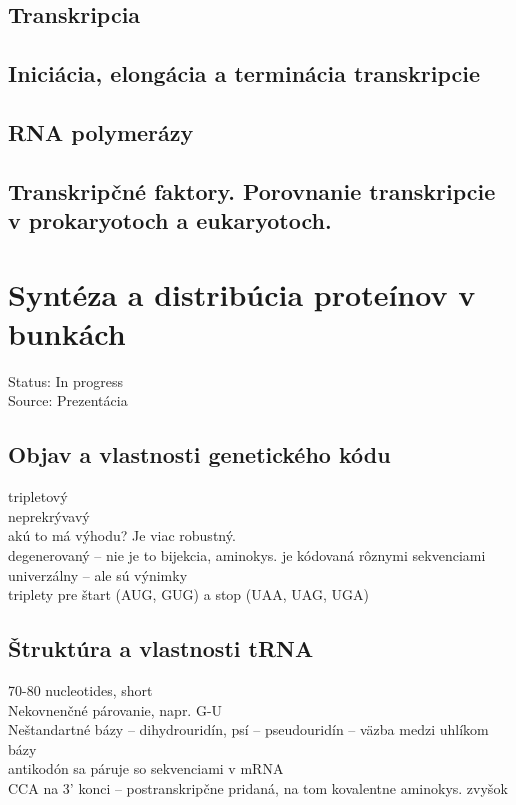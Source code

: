 \subsection{Transkripcia}

\subsection{Iniciácia, elongácia a terminácia transkripcie}

\subsection{RNA polymerázy}

\subsection{Transkripčné faktory. Porovnanie transkripcie v prokaryotoch a eukaryotoch.}

\section{Syntéza a distribúcia proteínov v bunkách}

Status: In progress\\
Source: Prezentácia \\

\subsection{Objav a vlastnosti genetického kódu}
tripletový\\
neprekrývavý\\
\tab akú to má výhodu? Je viac robustný. \\
degenerovaný -- nie je to bijekcia, aminokys. je kódovaná rôznymi sekvenciami\\
univerzálny -- ale sú výnimky\\
triplety pre štart (AUG, GUG) a stop (UAA, UAG, UGA)\\

\subsection{Štruktúra a vlastnosti tRNA}
70-80 nucleotides, short\\
Nekovnenčné párovanie, napr. G-U\\
Neštandartné bázy -- dihydrouridín, psí -- pseudouridín -- väzba medzi uhlíkom bázy\\
antikodón sa páruje so sekvenciami v mRNA\\
CCA na 3' konci -- postranskripčne pridaná, na tom kovalentne aminokys. zvyšok\\
